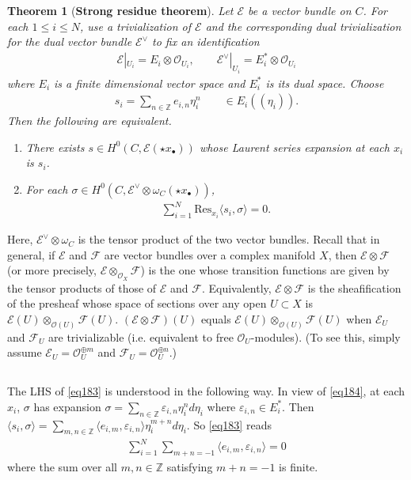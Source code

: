 \documentclass[12pt,a4paper,notitlepage]{article}
\theoremstyle{definition}
\theoremstyle{plain}
\newtheorem{thm}[df]{Theorem}
\newcommand{\Res}{\mathrm{Res}}
\newcommand{\bk}[1]{\langle {#1}\rangle}
\newcommand{\scr}{\mathscr}
\newcommand{\blt}{\bullet}
\newcommand{\Zbb}{\mathbb Z}
\numberwithin{equation}{section}
\begin{document}
\begin{thm}[\textbf{Strong residue theorem}]\label{lb104}
Let $\scr E$ be a vector bundle on $C$. For each $1\leq i\leq N$, use a trivialization of $\scr E$ and the corresponding dual trivialization for the dual vector bundle $\scr E^\vee$ to fix an identification
\begin{align}
\scr E|_{U_i}=E_i\otimes\scr O_{U_i},\qquad \scr E^\vee|_{U_i}=E_i^*\otimes\scr O_{U_i}\label{eq184}
\end{align}
where $E_i$ is a finite dimensional vector space and $E_i^*$ is its dual space. Choose
\begin{align}
s_i=\sum_{n\in\Zbb} e_{i,n}\eta_i^n\qquad\in E_i((\eta_i)). \label{eq185}
\end{align}
Then the following are equivalent.
\begin{enumerate}[label=(\alph*)]
\item There exists $s\in H^0(C,\scr E(\star x_\blt))$ whose Laurent series expansion at each $x_i$ is $s_i$.
\item For each $\sigma\in H^0(C,\scr E^\vee\otimes\omega_C(\star x_{\blt}))$,
\begin{align}
\sum_{i=1}^N \Res_{x_i}\bk{s_i,\sigma}=0. \label{eq183}
\end{align}
\end{enumerate}
\end{thm}
Here, $\scr E^\vee\otimes\omega_C$ is the tensor product of the two vector bundles. Recall that in general, if $\scr E$ and $\scr F$ are vector bundles over a complex manifold $X$, then $\scr E\otimes\scr F$ (or more precisely, $\scr E\otimes_{\scr O_X}\scr F$) is the one whose transition functions are given by the tensor products of those of $\scr E$ and $\scr F$. Equivalently, $\scr E\otimes\scr F$ is the sheafification of the presheaf whose space of sections over any open $U\subset X$ is $\scr E(U)\otimes_{\scr O(U)}\scr F(U)$. $(\scr E\otimes\scr F)(U)$ equals $\scr E(U)\otimes_{\scr O(U)}\scr F(U)$ when $\scr E_U$ and $\scr F_U$ are trivializable (i.e. equivalent to free $\scr O_U$-modules). (To see this, simply assume $\scr E_U=\scr O_U^{\oplus m}$ and $\scr F_U=\scr O_U^{\oplus n}$.)


\subsection{}


The LHS of \eqref{eq183} is understood in the following way. In view of \eqref{eq184}, at each $x_i$, $\sigma$ has expansion $\sigma=\sum_{n\in\Zbb}\varepsilon_{i,n} \eta_i^nd\eta_i$ where $\varepsilon_{i,n}\in E_i^*$. Then $\bk{s_i,\sigma}=\sum_{m,n\in\Zbb}\bk{e_{i,m},\varepsilon_{i,n}}\eta_i^{m+n}d\eta_i$. So \eqref{eq183} reads
\begin{align*}
\sum_{i=1}^N\sum_{m+n=-1}\bk{e_{i,m},\varepsilon_{i,n}}=0
\end{align*}
where the sum over all  $m,n\in\Zbb$ satisfying $m+n=-1$ is finite. 
\end{document}

